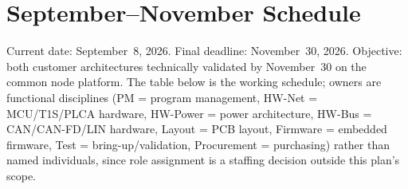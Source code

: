 \section{September--November Schedule}
\label{sec:schedule}

Current date: September~8, 2026. Final deadline: November~30, 2026. Objective: both customer architectures technically validated by November~30 on the common node platform. The table below is the working schedule; owners are functional disciplines (PM = program management, HW-Net = MCU/T1S/PLCA hardware, HW-Power = power architecture, HW-Bus = CAN/CAN-FD/LIN hardware, Layout = PCB layout, Firmware = embedded firmware, Test = bring-up/validation, Procurement = purchasing) rather than named individuals, since role assignment is a staffing decision outside this plan's scope.

